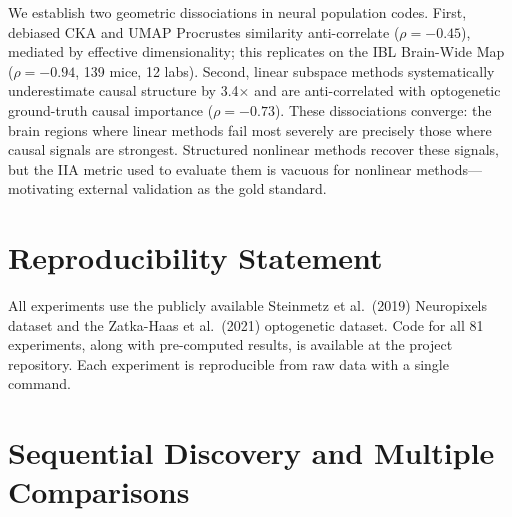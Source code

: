 \documentclass{article}
\begin{document}
We establish two geometric dissociations in neural population codes. First, debiased CKA and UMAP Procrustes similarity anti-correlate ($\rho = -0.45$), mediated by effective dimensionality; this replicates on the IBL Brain-Wide Map ($\rho = -0.94$, 139 mice, 12 labs). Second, linear subspace methods systematically underestimate causal structure by 3.4$\times$ and are anti-correlated with optogenetic ground-truth causal importance ($\rho = -0.73$). These dissociations converge: the brain regions where linear methods fail most severely are precisely those where causal signals are strongest. Structured nonlinear methods recover these signals, but the IIA metric used to evaluate them is vacuous for nonlinear methods---motivating external validation as the gold standard.


\section*{Reproducibility Statement}
All experiments use the publicly available Steinmetz et al.\ (2019) Neuropixels dataset and the Zatka-Haas et al.\ (2021) optogenetic dataset. Code for all 81 experiments, along with pre-computed results, is available at the project repository. Each experiment is reproducible from raw data with a single command.





\appendix

\section{Sequential Discovery and Multiple Comparisons}
\label{app:sequential}
\end{document}
